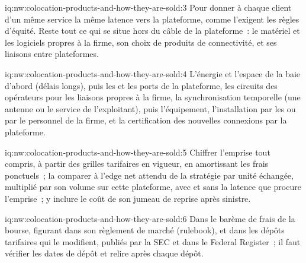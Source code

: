 \begin{solution}{iq:nw:colocation-products-and-how-they-are-sold:3}
Pour donner à chaque client d'un même service la même latence vers la plateforme, comme l'exigent les règles d'équité. Reste tout ce qui se situe hors du
câble de la plateforme~: le matériel et les logiciels propres à la firme, son choix de produits de connectivité, et ses liaisons entre plateformes.
\end{solution}

\begin{solution}{iq:nw:colocation-products-and-how-they-are-sold:4}
L'énergie et l'espace de la baie d'abord (délais longs), puis les  et les ports de la plateforme, les circuits des opérateurs pour les liaisons propres à la firme,
la synchronisation temporelle (une antenne ou le service de l'exploitant), puis l'équipement, l'installation par les  ou par le personnel de la firme, et la
certification des nouvelles connexions par la plateforme.
\end{solution}

\begin{solution}{iq:nw:colocation-products-and-how-they-are-sold:5}
Chiffrer l'emprise tout compris, à partir des grilles tarifaires en vigueur, en amortissant les frais ponctuels~; la comparer à l'edge net attendu de la stratégie par unité
échangée, multiplié par son volume sur cette plateforme, avec et sans la latence que procure l'emprise~; y inclure le coût de son jumeau de reprise après sinistre.
\end{solution}

\begin{solution}{iq:nw:colocation-products-and-how-they-are-sold:6}
Dans le barème de frais de la bourse, figurant dans son règlement de marché (rulebook), et dans les dépôts tarifaires qui le modifient, publiés par la SEC et dans le Federal Register~;
il faut vérifier les dates de dépôt et relire après chaque dépôt.
\end{solution}
